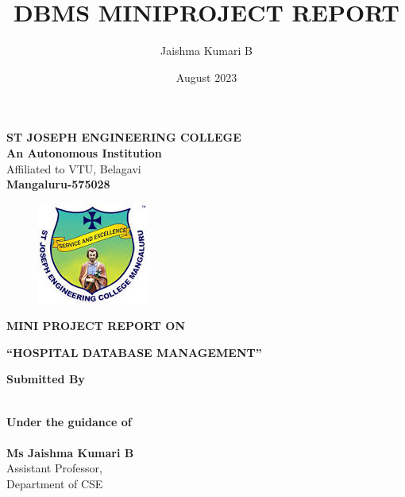 \documentclass[12pt, letter paper]{report}
\title{DBMS MINIPROJECT REPORT }
\author{Jaishma Kumari B}
\date{August 2023}
\begin{document}
\thispagestyle{empty}
\begin{center}
\Large\textbf{ ST JOSEPH ENGINEERING COLLEGE\\ }
\textbf{An Autonomous Institution}\\
Affiliated to VTU, Belagavi\\
\textbf{Mangaluru-575028}
\end{center}

\begin{figure}[h]
 \centering
 \includegraphics[scale=1.1]{sjec.jpeg}
 \label{sjeclogo}
\end{figure}

\begin{center}
   \textbf{ MINI PROJECT REPORT ON }
\end{center}
\begin{center}
   \Large\textbf{“HOSPITAL DATABASE MANAGEMENT”}
\end{center}



 
\begin{center}
   \Large \textbf{Submitted By \\}
\end{center}

\begin{center}
\end{center}
   \begin{center}
\large \textbf{\\Under the guidance of \\}
\large  \textbf{ \\Ms Jaishma Kumari B\\ }
\large  Assistant Professor,\\ Department of CSE
\end{center}
\end{document}
